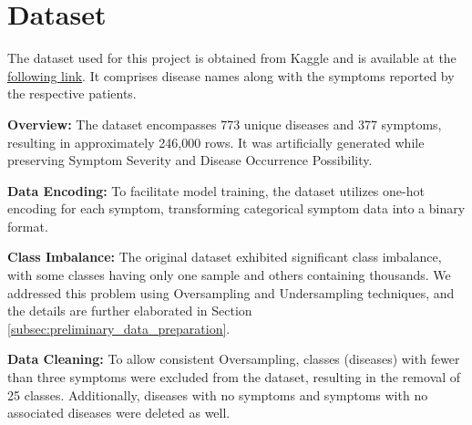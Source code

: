 \section{Dataset}

The dataset used for this project is obtained from Kaggle and is available at the 
\href{https://www.kaggle.com/datasets/dhivyeshrk/diseases-and-symptoms-dataset?select=Final_Augmented_dataset_Diseases_and_Symptoms.csv}{following link}. 
It comprises disease names along with the symptoms reported by the respective patients.

\noindent
\textbf{Overview:} The dataset encompasses 773 unique diseases and 377 symptoms, resulting in approximately 246,000 rows. 
It was artificially generated while preserving Symptom Severity and Disease Occurrence Possibility.

\noindent
\textbf{Data Encoding:} To facilitate model training, the dataset utilizes one-hot encoding for each symptom, transforming 
categorical symptom data into a binary format.

\noindent
\textbf{Class Imbalance:} The original dataset exhibited significant class imbalance, with some classes having only one 
sample and others containing thousands. We addressed this problem using Oversampling and Undersampling techniques,
and the details are further elaborated in Section \ref{subsec:preliminary_data_preparation}.

\noindent
\textbf{Data Cleaning:} To allow consistent Oversampling, classes (diseases) with fewer than three symptoms were excluded 
from the dataset, resulting in the removal of 25 classes. Additionally, diseases with no symptoms and symptoms with 
no associated diseases were deleted as well.

